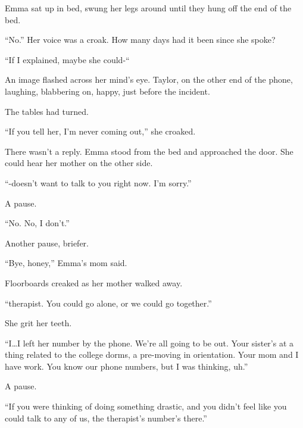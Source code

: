 Emma sat up in bed, swung her legs around until they hung off the end of the bed.



``No.''  Her voice was a croak.  How many days had it been since she spoke?



``If I explained, maybe she could-``



An image flashed across her mind's eye.  Taylor, on the other end of the phone, laughing, blabbering on, happy, just before the incident.



The tables had turned.



``If you tell her, I'm never coming out,'' she croaked.



There wasn't a reply.  Emma stood from the bed and approached the door.  She could hear her mother on the other side.



``-doesn't want to talk to you right now.  I'm sorry.''



A pause.



``No.  No, I don't.''



Another pause, briefer.



``Bye, honey,'' Emma's mom said.



Floorboards creaked as her mother walked away.



\sectionbreak



``\ldotsa therapist.  You could go alone, or we could go together.''



She grit her teeth.



``I\ldots I left her number by the phone.  We're all going to be out.  Your sister's at a thing related to the college dorms, a pre-moving in orientation.  Your mom and I have work.  You know our phone numbers, but I was thinking, uh.''



A pause.



``If you were thinking of doing something drastic, and you didn't feel like you could talk to any of us, the therapist's number's there.''




